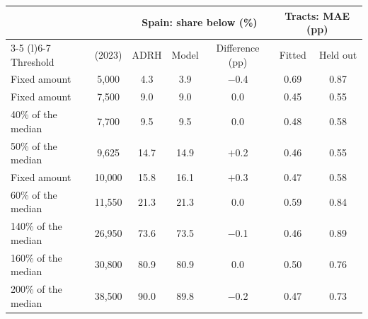 \begin{tabular}{@{}lcccccc@{}}
\toprule
 & & \multicolumn{3}{c}{Spain: share below (\%)} & \multicolumn{2}{c}{Tracts: MAE (pp)} \\ \cmidrule(lr){3-5} \cmidrule(l){6-7}
Threshold & \texteuro{} (2023) & ADRH & Model & Difference (pp) & Fitted & Held out \\
\midrule
Fixed amount & 5,000 & 4.3 & 3.9 & $-$0.4 & 0.69 & 0.87 \\
Fixed amount & 7,500 & 9.0 & 9.0 & 0.0 & 0.45 & 0.55 \\
40\% of the median & 7,700 & 9.5 & 9.5 & 0.0 & 0.48 & 0.58 \\
50\% of the median & 9,625 & 14.7 & 14.9 & $+$0.2 & 0.46 & 0.55 \\
Fixed amount & 10,000 & 15.8 & 16.1 & $+$0.3 & 0.47 & 0.58 \\
60\% of the median & 11,550 & 21.3 & 21.3 & 0.0 & 0.59 & 0.84 \\
140\% of the median & 26,950 & 73.6 & 73.5 & $-$0.1 & 0.46 & 0.89 \\
160\% of the median & 30,800 & 80.9 & 80.9 & 0.0 & 0.50 & 0.76 \\
200\% of the median & 38,500 & 90.0 & 89.8 & $-$0.2 & 0.47 & 0.73 \\
\bottomrule
\end{tabular}

